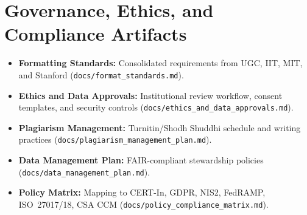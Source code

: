 \chapter{Governance, Ethics, and Compliance Artifacts}\label{app:governance}
\begin{itemize}
    \item \textbf{Formatting Standards:} Consolidated requirements from UGC, IIT, MIT, and Stanford (\texttt{docs/format\_standards.md}).
    \item \textbf{Ethics and Data Approvals:} Institutional review workflow, consent templates, and security controls (\texttt{docs/ethics\_and\_data\_approvals.md}).
    \item \textbf{Plagiarism Management:} Turnitin/Shodh Shuddhi schedule and writing practices (\texttt{docs/plagiarism\_management\_plan.md}).
    \item \textbf{Data Management Plan:} FAIR-compliant stewardship policies (\texttt{docs/data\_management\_plan.md}).
    \item \textbf{Policy Matrix:} Mapping to CERT-In, GDPR, NIS2, FedRAMP, ISO~27017/18, CSA CCM (\texttt{docs/policy\_compliance\_matrix.md}).
\end{itemize}
